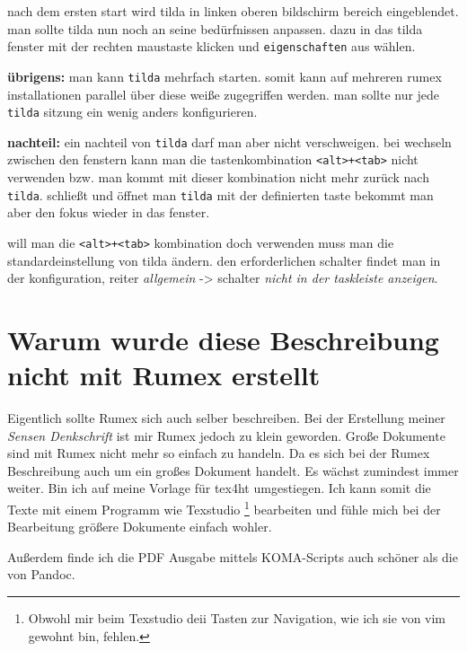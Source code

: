 nach dem ersten start wird tilda in linken oberen bildschirm bereich
eingeblendet. man sollte tilda nun noch an seine bedürfnissen anpassen.
dazu in das tilda fenster mit der rechten maustaste klicken und
\texttt{eigenschaften} aus wählen.

\textbf{übrigens:} man kann \texttt{tilda} mehrfach starten. somit kann
auf mehreren rumex installationen parallel über diese weiße zugegriffen
werden. man sollte nur jede \texttt{tilda} sitzung ein wenig anders
konfigurieren.

\textbf{nachteil:} ein nachteil von \texttt{tilda} darf man aber nicht
verschweigen. bei wechseln zwischen den fenstern kann man die
tastenkombination
\texttt{\textless{}alt\textgreater{}+\textless{}tab\textgreater{}} nicht
verwenden bzw. man kommt mit dieser kombination nicht mehr zurück nach
\texttt{tilda}. schließt und öffnet man \texttt{tilda} mit der
definierten taste bekommt man aber den fokus wieder in das fenster.

will man die
\texttt{\textless{}alt\textgreater{}+\textless{}tab\textgreater{}}
kombination doch verwenden muss man die standardeinstellung von tilda
ändern. den erforderlichen schalter findet man in der konfiguration,
reiter \emph{allgemein} -\textgreater{} schalter \emph{nicht in der
taskleiste anzeigen}.



\section{Warum wurde diese Beschreibung nicht mit Rumex erstellt}

Eigentlich sollte Rumex sich auch selber beschreiben.
Bei der Erstellung meiner \emph{Sensen Denkschrift} ist mir Rumex 
jedoch zu klein geworden. 
Große Dokumente sind mit Rumex nicht mehr so einfach zu handeln.
Da es sich bei der Rumex Beschreibung auch um ein großes Dokument handelt. Es wächst zumindest immer weiter. Bin ich auf meine Vorlage für tex4ht umgestiegen.
Ich kann somit die Texte mit einem Programm wie
Texstudio%
\footnote{Obwohl mir beim Texstudio deii Tasten zur Navigation,
wie ich sie von vim gewohnt bin, fehlen.} 
bearbeiten und fühle mich bei der Bearbeitung 
größere Dokumente einfach wohler.

Außerdem finde ich die PDF Ausgabe mittels KOMA-Scripts auch 
schöner als die von Pandoc.


